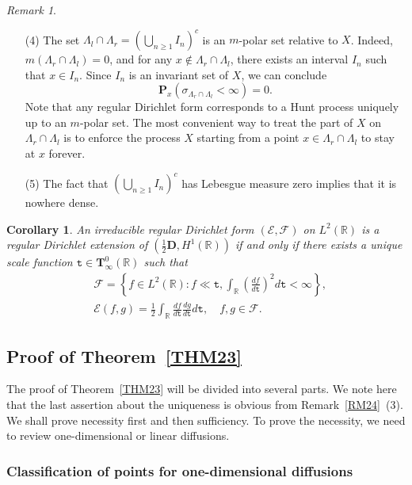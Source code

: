 \documentclass[a4paper]{amsart}
\newtheorem{corollary}[theorem]{Corollary}
\theoremstyle{definition}
\theoremstyle{remark}
\newtheorem{remark}[theorem]{Remark}
\numberwithin{equation}{section}
\begin{document}
\begin{remark}
{\begin{itemize}
\item[(4)] The set $\Lambda_l\cap \Lambda_r=\left(\bigcup_{n\geq 1}I_n\right)^c$ is an $m$-polar set relative to $X$. Indeed, $m(\Lambda_r\cap \Lambda_l)=0$, and for any $x\notin \Lambda_r\cap \Lambda_l$, there exists an interval $I_n$ such that $x\in I_n$. Since $I_n$ is an invariant set of $X$, we can conclude
\[
	\mathbf{P}_x(\sigma_{\Lambda_r\cap \Lambda_l}<\infty)=0.
\]
Note that any regular Dirichlet form corresponds to a Hunt process uniquely up to an $m$-polar set. The most convenient way to treat the part of $X$ on $\Lambda_r\cap \Lambda_l$ is to enforce the process $X$ starting from a point $x\in \Lambda_r\cap \Lambda_l$ to stay at $x$ forever.
\item[(5)] The fact that $\left(\bigcup_{n\geq 1} I_n\right)^c$ has Lebesgue measure zero implies that it is nowhere dense.
\end{itemize}}
\end{remark}

\begin{corollary}
An irreducible regular Dirichlet form $({{\mathcal{E}}},{{\mathcal{F}}})$ on $L^2(\mathbb{R})$ is a regular Dirichlet extension of $(\frac{1}{2}\mathbf{D},H^1(\mathbb{R}))$ if and only if there exists a unique scale function ${{\mathtt{t}}}\in {{\mathbf{T}}}_\infty^0(\mathbb{R})$ such that
\[
\begin{aligned}
	&{{\mathcal{F}}}=\left\{f\in L^2(\mathbb{R}): f\ll {{\mathtt{t}}}, \int_{\mathbb{R}}\left(\frac{df}{d{{\mathtt{t}}}}\right)^2d{{\mathtt{t}}}<\infty \right\}, \\
&{{\mathcal{E}}}(f,g)=\frac{1}{2}\int_{\mathbb{R}}\frac{df}{d{{\mathtt{t}}}}\frac{dg}{d{{\mathtt{t}}}}d{{\mathtt{t}}},\quad f,g\in {{\mathcal{F}}}.
\end{aligned}
\]
\end{corollary}

\subsection{Proof of Theorem~\ref{THM23}}\label{SEC22}

The proof of Theorem~\ref{THM23} will be divided into several parts. We note here that the last assertion about the uniqueness is obvious from Remark~\ref{RM24}~(3). We shall prove necessity first and then sufficiency. To prove the necessity, we need to review one-dimensional or linear diffusions.

\subsubsection{Classification of points for one-dimensional diffusions}\label{SEC221}
\end{document}
